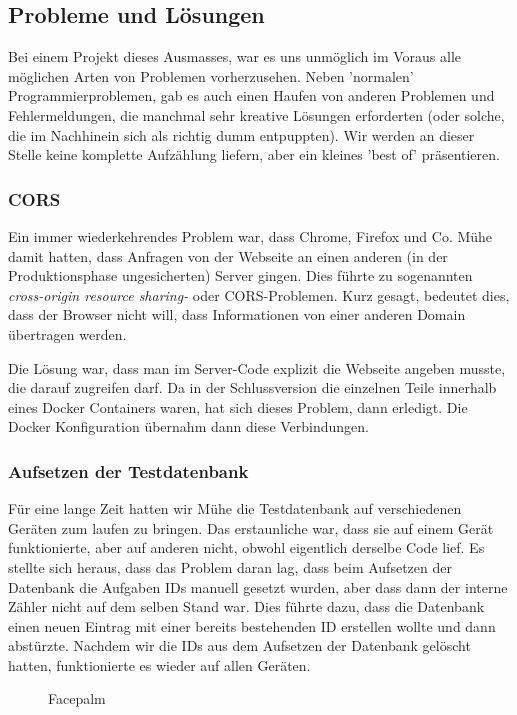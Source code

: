 \subsection{Probleme und Lösungen}

Bei einem Projekt dieses Ausmasses, war es uns unmöglich im Voraus alle möglichen Arten von Problemen vorherzusehen. Neben 'normalen' Programmierproblemen, gab es auch einen Haufen von anderen Problemen und Fehlermeldungen, die manchmal sehr kreative Lösungen erforderten (oder solche, die im Nachhinein sich als richtig dumm entpuppten). Wir werden an dieser Stelle keine komplette Aufzählung liefern, aber ein kleines 'best of' präsentieren.

\subsubsection{CORS} 
Ein immer wiederkehrendes Problem war, dass Chrome, Firefox und Co. Mühe damit hatten, dass Anfragen von der Webseite an einen anderen (in der Produktionsphase ungesicherten) Server gingen. Dies führte zu sogenannten \emph{cross-origin resource sharing-} oder CORS-Problemen. Kurz gesagt, bedeutet dies, dass der Browser nicht will, dass Informationen von einer anderen Domain übertragen werden.

Die Lösung war, dass man im Server-Code explizit die Webseite angeben musste, die darauf zugreifen darf. Da in der Schlussversion die einzelnen Teile innerhalb eines Docker Containers waren, hat sich dieses Problem, dann erledigt. Die Docker Konfiguration übernahm dann diese Verbindungen.

\subsubsection{Aufsetzen der Testdatenbank}
Für eine lange Zeit hatten wir Mühe die Testdatenbank auf verschiedenen Geräten zum laufen zu bringen. Das erstaunliche war, dass sie auf einem Gerät funktionierte, aber auf anderen nicht, obwohl eigentlich derselbe Code lief. Es stellte sich heraus, dass das Problem daran lag, dass beim Aufsetzen der Datenbank die Aufgaben IDs manuell gesetzt wurden, aber dass dann der interne Zähler nicht auf dem selben Stand war. Dies führte dazu, dass die Datenbank einen neuen Eintrag mit einer bereits bestehenden ID erstellen wollte und dann abstürzte. Nachdem wir die IDs aus dem Aufsetzen der Datenbank gelöscht hatten, funktionierte es wieder auf allen Geräten.

\begin{figure}[ht]
    \caption{Facepalm \cite{fig:facepalm}}
\end{figure}

